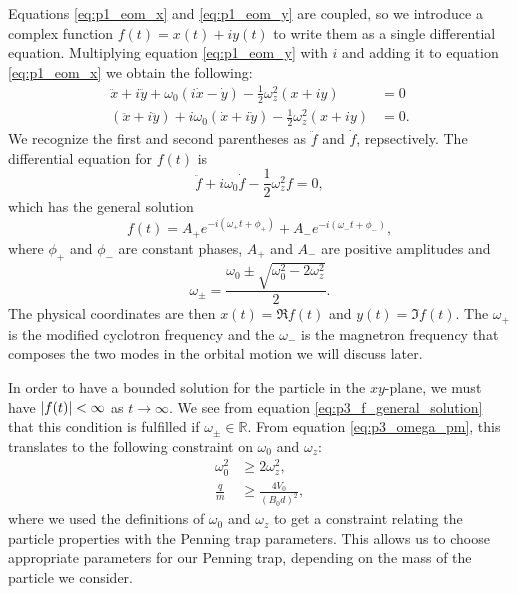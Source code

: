 Equations \eqref{eq:p1_eom_x} and \eqref{eq:p1_eom_y} are coupled, so we introduce a complex function $f(t)=x(t) + iy(t)$ to write them as a single differential equation. Multiplying equation \eqref{eq:p1_eom_y} with $i$ and adding it to equation \eqref{eq:p1_eom_x} we obtain the following:
\begin{align}
    \ddot{x} + i\ddot{y} + \omega_0(i\dot{x} - \dot{y}) -\frac{1}{2}\omega_z^2(x+iy) &= 0 \nonumber \\
    (\ddot{x} + i\ddot{y}) + i\omega_0(\dot{x} +i \dot{y}) -\frac{1}{2}\omega_z^2(x+iy) &= 0. \label{eq:p2_eom_rewritten}
\end{align}
We recognize the first and second parentheses as $\ddot{f}$ and $\dot{f}$, repsectively. The differential equation for $f(t)$ is
\begin{equation}
    \ddot{f} + i\omega_0 \dot{f} - \frac{1}{2}\omega_z^2 f = 0, \label{eq:p2_f_complex_equation}
\end{equation}
which has the general solution 
\begin{equation}
    f(t) = A_+ e^{-i(\omega_+ t + \phi_+)} + A_- e^{-i(\omega_- t + \phi_-)}, \label{eq:p3_f_general_solution}
\end{equation}
where $\phi_+$ and $\phi_-$ are constant phases, $A_+$ and $A_-$ are positive amplitudes and 
\begin{equation}
    \omega_\pm = \frac{\omega_0 \pm \sqrt{\omega_0^2 - 2\omega_z^2}}{2}. \label{eq:p3_omega_pm}
\end{equation}
The physical coordinates are then $x(t)=\Re f(t)$ and $y(t)=\Im f(t)$.  The $\omega_+$ is the modified cyclotron frequency and the $\omega_-$ is the magnetron frequency that composes the two modes in the orbital motion we will discuss later.

In order to have a bounded solution for the particle in the $xy$-plane, we must have $\abs{f(t)} < \infty$ as $t\to\infty$. We see from equation \eqref{eq:p3_f_general_solution} that this condition is fulfilled if $\omega_\pm\in\mathbb{R}$. From equation \eqref{eq:p3_omega_pm}, this translates to the following constraint on $\omega_0$ and $\omega_z$:  
\begin{equation}\label{eq:p3_omega_constraints}
    \begin{split}
        \omega_0^2 &\geq 2\omega_z^2, \\ 
        \frac{q}{m} &\geq \frac{4V_0}{(B_0d)^2},
    \end{split}
\end{equation} 
where we used the definitions of $\omega_0$ and $\omega_z$ to get a constraint relating the particle properties with the Penning trap parameters. This allows us to choose appropriate parameters for our Penning trap, depending on the mass of the particle we consider. 

